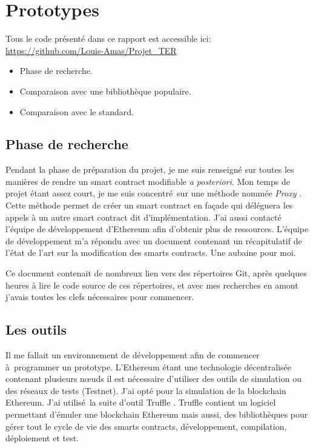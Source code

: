 \section{Prototypes}

Tous le code présenté dans ce rapport est accessible ici: \url{https://github.com/Louis-Amas/Projet\_TER}

\begin{itemize}
    \item Phase de recherche.
    \item Comparaison avec une bibliothèque populaire.
    \item Comparaison avec le standard.
\end{itemize}

\subsection{Phase de recherche}

Pendant la phase de préparation du projet, je me suis renseigné sur toutes les manières de rendre un smart contract modifiable \emph{a posteriori}.
Mon temps de projet étant assez court, je me suis concentré sur une méthode nommée \emph{Proxy} \cite{PROXY}. Cette méthode permet de créer un
smart contract en façade qui déléguera les appels à un autre smart contract dit d'implémentation. J'ai aussi contacté
l'équipe de développement d'Ethereum afin d'obtenir plus de ressources. L'équipe de développement m'a répondu avec un document
contenant un récapitulatif de l'état de l'art sur la modification des smarts contracts. Une aubaine pour moi.

Ce document contenait de nombreux lien vers des répertoires Git, après quelques heures à lire le code source de ces répertoires,
et avec mes recherches en amont j'avais toutes les clefs nécessaires pour commencer. 

\subsection{Les outils}

Il me fallait un environnement de développement afin de commencer à programmer un prototype. L'Ethereum étant une technologie
décentralisée contenant plusieurs nœuds il est nécessaire d'utiliser des outils de simulation ou des réseaux de tests (Testnet).
J'ai opté pour la simulation de la blockchain Ethereum. J'ai utilisé la suite d'outil Truffle \cite{Truffle}.
%
Truffle contient un logiciel permettant d'émuler une blockchain Ethereum mais aussi, des bibliothèques pour gérer tout le cycle 
de vie des smarts contracts, développement, compilation, déploiement et test.

